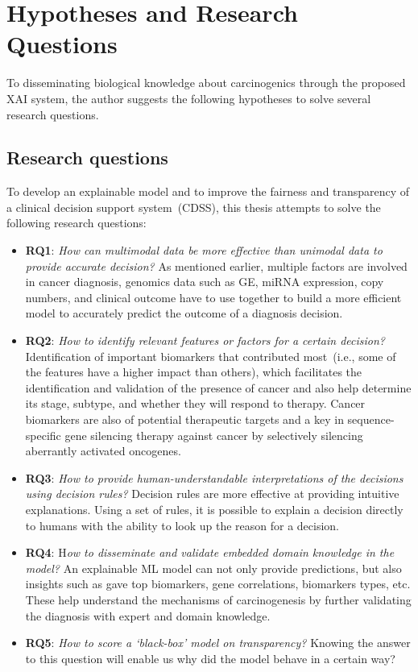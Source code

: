 \section{Hypotheses and Research Questions} \label{hypotheses}
To disseminating biological knowledge about carcinogenics through the proposed XAI system, the author suggests the following hypotheses to solve several research questions.  
\subsection{Research questions}
To develop an explainable model and to improve the fairness and transparency of a clinical decision support system~(CDSS), this thesis attempts to solve the following research questions: 

\vspace{-2mm}
\begin{itemize}[noitemsep]
    \item \textbf{RQ1}: \textit{How can multimodal data be more effective than unimodal data to provide accurate decision?} As mentioned earlier, multiple factors are involved in cancer diagnosis, genomics data such as GE, miRNA expression, copy numbers, and clinical outcome have to use together to build a more efficient model to accurately predict the outcome of a diagnosis decision.  
    \item \textbf{RQ2}: \textit{How to identify relevant features or factors for a certain decision?} Identification of important biomarkers that contributed most~(i.e., some of the features have a higher impact than others), which facilitates the identification and validation of the presence of cancer and also help determine its stage, subtype, and whether they will respond to therapy. Cancer biomarkers are also of potential therapeutic targets and a key in sequence-specific gene silencing therapy against cancer by selectively silencing aberrantly activated oncogenes.  
    \item \textbf{RQ3}: \textit{How to provide human-understandable interpretations of the decisions using decision rules?} Decision rules are more effective at providing intuitive explanations. Using a set of rules, it is possible to explain a decision directly to humans with the ability to look up the reason for a decision. 
    \item \textbf{RQ4}: H\textit{ow to disseminate and validate embedded domain knowledge in the model?} An explainable ML model can not only provide predictions, but also insights such as gave top biomarkers, gene correlations, biomarkers types, etc. These help understand the mechanisms of carcinogenesis by further validating the diagnosis with expert and domain knowledge. 
    \item \textbf{RQ5}: \textit{How to score a `black-box' model on transparency?} Knowing the answer to this question will enable us why did the model behave in a certain way? 
\end{itemize}
\vspace{-2mm}

